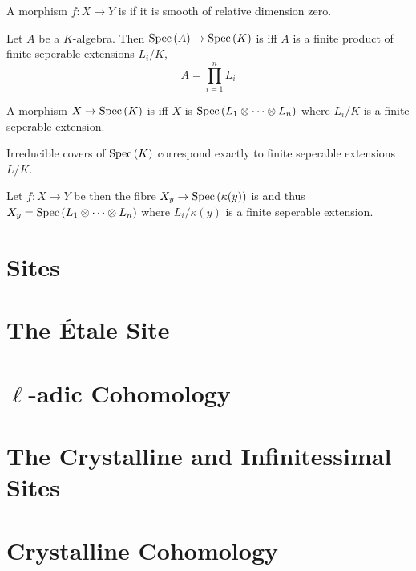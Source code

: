 \documentclass[12pt]{article}
\begin{document}
\begin{definition}
A morphism $f : X \to Y$ is \textit{\etale} if it is smooth of relative dimension zero. 
\end{definition}

\begin{lemma}
Let $A$ be a $K$-algebra. Then $\mathrm{Spec}\left( A \right) \to \mathrm{Spec}\left( K \right)$ is \etale iff $A$ is a finite product of finite seperable extensions $L_i / K$,
\[ A = \prod_{i = 1}^n L_i \]
\end{lemma}

\begin{proposition}
A morphism $X \to \mathrm{Spec}\left( K \right)$ is \etale iff $X$ is $\mathrm{Spec}\left( L_1 \otimes \cdots \otimes L_n \right)$ where $L_i / K$ is a finite seperable extension.
\end{proposition}


\begin{corollary}
Irreducible \etale covers of $\mathrm{Spec}\left( K \right)$ correspond exactly to finite seperable extensions $L / K$. 
\end{corollary}

\begin{corollary}
Let $f : X \to Y$ be \etale then the fibre $X_{y} \to \mathrm{Spec}\left( \kappa(y) \right)$ is \etale and thus $X_{y} = \mathrm{Spec}\left( L_1 \otimes \cdots \otimes L_n \right)$ where $L_i / \kappa(y)$ is a finite seperable extension.
\end{corollary}

\section{Sites}


\section{The \'{E}tale Site}

\section{$\ell$-adic Cohomology}

\section{The Crystalline and Infinitessimal Sites}

\section{Crystalline Cohomology}
\end{document}

